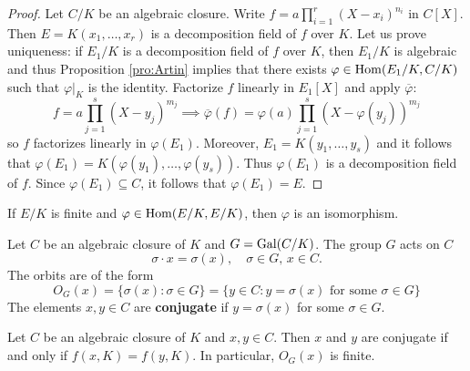 \begin{proof}
    Let $C/K$ be an algebraic closure. Write $f=a\prod_{i=1}^r(X-x_i)^{n_i}$ in $C[X]$. 
    Then $E=K(x_1,\dots,x_r)$ is a decomposition field of $f$ over $K$. Let us prove
    uniqueness: if $E_1/K$ is a decomposition field of $f$ over $K$, 
    then $E_1/K$ is algebraic and thus Proposition
    \ref{pro:Artin} implies that 
    there exists $\varphi\in\operatorname{Hom}(E_1/K,C/K)$ such that $\varphi|_K$ is the identity.
    Factorize $f$ linearly in $E_1[X]$ and apply $\overline{\varphi}$:
    \[
    f=a\prod_{j=1}^s(X-y_j)^{m_j}
    \implies
    \overline{\varphi}(f)=\varphi(a)\prod_{j=1}^s(X-\varphi(y_j))^{m_j}
    \]
    so $f$ factorizes linearly in $\varphi(E_1)$. Moreover, 
    $E_1=K(y_1,\dots,y_s)$ and it follows that 
    $\varphi(E_1)=K(\varphi(y_1),\dots,\varphi(y_s))$. Thus
    $\varphi(E_1)$ is a decomposition field of $f$. Since  
    $\varphi(E_1)\subseteq C$, it follows that $\varphi(E_1)=E$. 
\end{proof}

\begin{exercise}
If $E/K$ is finite and $\varphi\in\operatorname{Hom}(E/K,E/K)$, 
then $\varphi$ is an isomorphism. 
\end{exercise}

Let $C$ be an algebraic closure of $K$ and 
$G=\operatorname{Gal}(C/K)$. The group $G$ acts on $C$
\[
\sigma\cdot x=\sigma(x),\quad
\sigma\in G,\,x\in C.
\]
The orbits 
are of the form 
\[
O_G(x)=\{\sigma(x):\sigma\in G\}
=\{y\in C:y=\sigma(x)\text{ for some $\sigma\in G$}\}
\]
The elements $x,y\in C$ are \textbf{conjugate} 
if $y=\sigma(x)$ for some $\sigma\in G$. 

\begin{proposition}
    Let $C$ be an algebraic closure of $K$ and $x,y\in C$. Then 
    $x$ and $y$ are conjugate if and only if $f(x,K)=f(y,K)$. In particular, 
    $O_G(x)$ is finite. 
\end{proposition}

